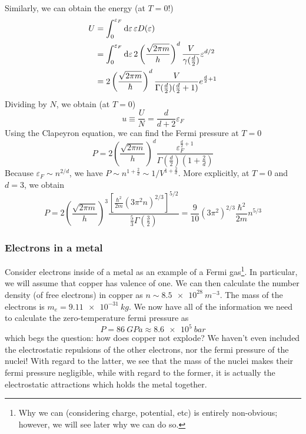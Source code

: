 Similarly, we can obtain the energy (at \(T=0\)!)
\begin{align}
	U &= \int_0^{\varepsilon_F}\d{\varepsilon}\varepsilon D(\varepsilon)\\
	  &=\int_0^{\varepsilon_F}\d\varepsilon2\left(\frac{\sqrt{2\pi m}}{h}\right)^d\frac{V}{\gamma(\frac{d}{2})}\varepsilon^{d/2}\nonumber\\
	  &=2\left(\frac{\sqrt{2\pi m}}{\hbar}\right)^d\frac{V}{\Gamma(\frac{d}{2})(\frac{d}{2}+1)}e^{\frac{d}{2}+1}
\end{align}
Dividing by \(N\), we obtain (at \(T=0\))
\begin{equation}
	u\equiv\frac{U}{N} = \frac{d}{d+2}\varepsilon_F
\end{equation}
Using the Clapeyron equation, we can find the Fermi pressure at \(T=0\)
\begin{equation}
	P = 2\left(\frac{\sqrt{2\pi m}}{h}\right)^d\frac{\varepsilon_F^{\frac{d}{2}+1}}{\Gamma(\frac{d}{2})(1+\frac{2}{d})}
\end{equation}
Because \(\varepsilon_F\sim n^{2/d}\), we have \(P\sim n^{1+\frac{2}{d}}\sim1/V^{1+\frac{2}{d}}\). More explicitly, at \(T=0\) and \(d=3\), we obtain
\[P = 2\left(\frac{\sqrt{2\pi m}}{h}\right)^3\frac{[\frac{\hbar^2}{2m}(3\pi^2n)^{2/3}]^{5/2}}{\frac{5}{3}\Gamma(\frac{3}{2})} = \frac{9}{10}(3\pi^2)^{2/3}\frac{\hbar^2}{2m}n^{5/3}\]
\subsubsection{Electrons in a metal}
Consider electrons inside of a metal as an example of a Fermi gas\footnote{Why we can (considering charge, potential, etc) is entirely non-obvious; however, we will see later why we can do so.}. In particular, we will assume that copper has valence of one. We can then calculate the number density (of free electrons) in copper as \(n\sim\SI{8.5e28}{m^{-3}}\). The mass of the electrons is \(m_e = \SI{9.11e-31}{kg}\). We now have all of the information we need to calculate the zero-temperature fermi pressure as
\[P=\SI{86}{GPa}\approx \SI{8.6e5}{bar}\]
which begs the question: how does copper not explode? We haven't even included the electrostatic repulsions of the other electrons, nor the fermi pressure of the nuclei! With regard to the latter, we see that the mass of the nuclei makes their fermi pressure negligible, while with regard to the former, it is actually the electrostatic attractions which holds the metal together.


